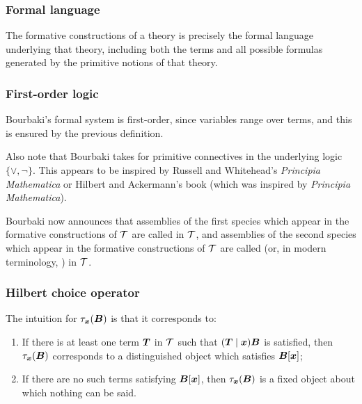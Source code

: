 \subsubsection{Formal language}
The formative constructions of a theory is precisely the formal language
underlying that theory, including both the terms and all possible
formulas generated by the primitive notions of that theory.

\subsubsection{First-order logic}
Bourbaki's formal system is first-order, since variables range over
terms, and this is ensured by the previous definition.

Also note that Bourbaki takes for primitive connectives in the
underlying logic $\{\lor,\neg\}$. This appears to be inspired by
Russell and Whitehead's \textit{Principia Mathematica} or Hilbert and
Ackermann's book (which was inspired by \textit{Principia Mathematica}).

\begin{definition}
Bourbaki now announces that assemblies of the first species which appear
in the formative constructions of $\mathcal{T}$ are called
 in $\mathcal{T}$, and assemblies of the second species
which appear in the formative constructions of $\mathcal{T}$ are called
 (or, in modern terminology, ) in
$\mathcal{T}$. 
\end{definition}

\subsubsection{Hilbert choice operator}\label{subsubsec:1-3:intuition-of-tau}
The intuition for $\tau_{\boldsymbol{x}}(\boldsymbol{B})$ is that it
corresponds to:
\begin{enumerate}
\item If there is at least one term $\boldsymbol{T}$ in $\mathcal{T}$
  such that $(\boldsymbol{T}\mid\boldsymbol{x})\boldsymbol{B}$ is
  satisfied, then $\tau_{\boldsymbol{x}}(\boldsymbol{B})$
  corresponds to a distinguished object which satisfies $\boldsymbol{B}[\boldsymbol{x}]$;
\item If there are no such terms satisfying
  $\boldsymbol{B}[\boldsymbol{x}]$, then
  $\tau_{\boldsymbol{x}}(\boldsymbol{B})$ is a fixed object about
  which nothing can be said.
\end{enumerate}
